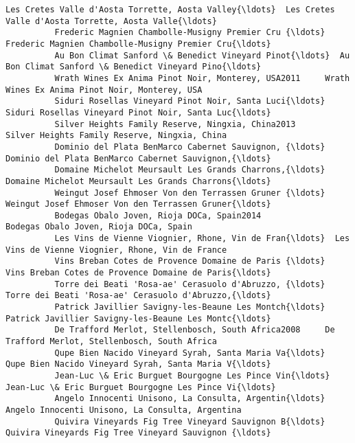 \documentclass[11pt]{article}
\begin{document}
\begin{Verbatim}[commandchars=\\\{\}]
          Les Cretes Valle d'Aosta Torrette, Aosta Valley{\ldots}  Les Cretes Valle d'Aosta Torrette, Aosta Valle{\ldots}   
          Frederic Magnien Chambolle-Musigny Premier Cru {\ldots}  Frederic Magnien Chambolle-Musigny Premier Cru{\ldots}   
          Au Bon Climat Sanford \& Benedict Vineyard Pinot{\ldots}  Au Bon Climat Sanford \& Benedict Vineyard Pino{\ldots}   
          Wrath Wines Ex Anima Pinot Noir, Monterey, USA2011     Wrath Wines Ex Anima Pinot Noir, Monterey, USA   
          Siduri Rosellas Vineyard Pinot Noir, Santa Luci{\ldots}  Siduri Rosellas Vineyard Pinot Noir, Santa Luc{\ldots}   
          Silver Heights Family Reserve, Ningxia, China2013       Silver Heights Family Reserve, Ningxia, China   
          Dominio del Plata BenMarco Cabernet Sauvignon, {\ldots}  Dominio del Plata BenMarco Cabernet Sauvignon,{\ldots}   
          Domaine Michelot Meursault Les Grands Charrons,{\ldots}  Domaine Michelot Meursault Les Grands Charrons{\ldots}   
          Weingut Josef Ehmoser Von den Terrassen Gruner {\ldots}  Weingut Josef Ehmoser Von den Terrassen Gruner{\ldots}   
          Bodegas Obalo Joven, Rioja DOCa, Spain2014                     Bodegas Obalo Joven, Rioja DOCa, Spain   
          Les Vins de Vienne Viognier, Rhone, Vin de Fran{\ldots}  Les Vins de Vienne Viognier, Rhone, Vin de France   
          Vins Breban Cotes de Provence Domaine de Paris {\ldots}  Vins Breban Cotes de Provence Domaine de Paris{\ldots}   
          Torre dei Beati 'Rosa-ae' Cerasuolo d'Abruzzo, {\ldots}  Torre dei Beati 'Rosa-ae' Cerasuolo d'Abruzzo,{\ldots}   
          Patrick Javillier Savigny-les-Beaune Les Montch{\ldots}  Patrick Javillier Savigny-les-Beaune Les Montc{\ldots}   
          De Trafford Merlot, Stellenbosch, South Africa2008     De Trafford Merlot, Stellenbosch, South Africa   
          Qupe Bien Nacido Vineyard Syrah, Santa Maria Va{\ldots}  Qupe Bien Nacido Vineyard Syrah, Santa Maria V{\ldots}   
          Jean-Luc \& Eric Burguet Bourgogne Les Pince Vin{\ldots}  Jean-Luc \& Eric Burguet Bourgogne Les Pince Vi{\ldots}   
          Angelo Innocenti Unisono, La Consulta, Argentin{\ldots}   Angelo Innocenti Unisono, La Consulta, Argentina   
          Quivira Vineyards Fig Tree Vineyard Sauvignon B{\ldots}  Quivira Vineyards Fig Tree Vineyard Sauvignon {\ldots}   
          

\end{Verbatim}
\end{document}
